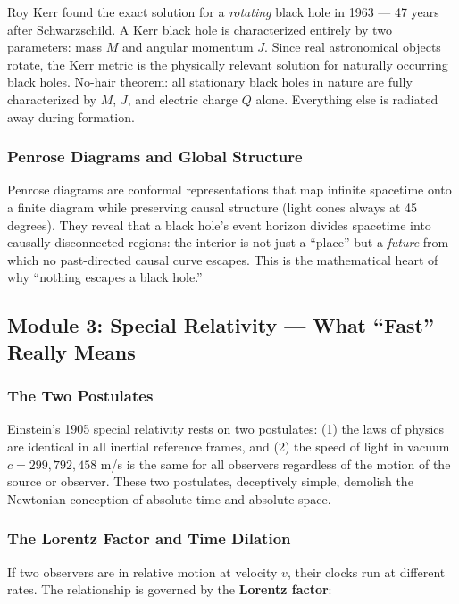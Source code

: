 \documentclass[11pt,letterpaper]{article}
\begin{document}
Roy Kerr found the exact solution for a \textit{rotating} black hole in 1963 --- 47 years after Schwarzschild. A Kerr black hole is characterized entirely by two parameters: mass $M$ and angular momentum $J$. Since real astronomical objects rotate, the Kerr metric is the physically relevant solution for naturally occurring black holes. No-hair theorem: all stationary black holes in nature are fully characterized by $M$, $J$, and electric charge $Q$ alone. Everything else is radiated away during formation.

\subsubsection{Penrose Diagrams and Global Structure}

Penrose diagrams are conformal representations that map infinite spacetime onto a finite diagram while preserving causal structure (light cones always at 45 degrees). They reveal that a black hole's event horizon divides spacetime into causally disconnected regions: the interior is not just a ``place'' but a \textit{future} from which no past-directed causal curve escapes. This is the mathematical heart of why ``nothing escapes a black hole.''

\subsection{Module 3: Special Relativity --- What ``Fast'' Really Means}

\subsubsection{The Two Postulates}

Einstein's 1905 special relativity rests on two postulates: (1) the laws of physics are identical in all inertial reference frames, and (2) the speed of light in vacuum $c = 299{,}792{,}458$ m/s is the same for all observers regardless of the motion of the source or observer. These two postulates, deceptively simple, demolish the Newtonian conception of absolute time and absolute space.

\subsubsection{The Lorentz Factor and Time Dilation}

If two observers are in relative motion at velocity $v$, their clocks run at different rates. The relationship is governed by the \textbf{Lorentz factor}:
\end{document}
